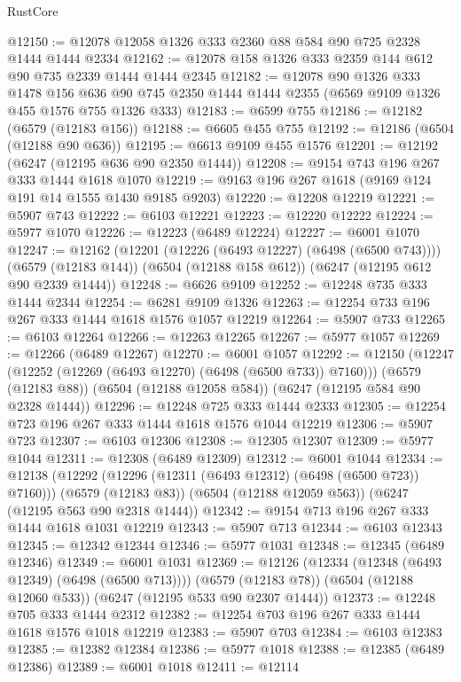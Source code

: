 \begin{lexlean}{RustCore}
\begin{coremodule}
@12150 := @12078 @12058 @1326 @333 @2360 @88 @584 @90 @725 @2328 @1444 @1444 @2334
@12162 := @12078 @158 @1326 @333 @2359 @144 @612 @90 @735 @2339 @1444 @1444 @2345
@12182 := @12078
    @90
    @1326
    @333
    @1478
    @156
    @636
    @90
    @745
    @2350
    @1444
    @1444
    @2355
    (@6569 @9109 @1326 @455 @1576 @755 @1326 @333)
@12183 := @6599 @755
@12186 := @12182 (@6579 (@12183 @156))
@12188 := @6605 @455 @755
@12192 := @12186 (@6504 (@12188 @90 @636))
@12195 := @6613 @9109 @455 @1576
@12201 := @12192 (@6247 (@12195 @636 @90 @2350 @1444))
@12208 := @9154 @743 @196 @267 @333 @1444 @1618 @1070
@12219 := @9163 @196 @267 @1618 (@9169 @124 @191 @14 @1555 @1430 @9185 @9203)
@12220 := @12208 @12219
@12221 := @5907 @743
@12222 := @6103 @12221
@12223 := @12220 @12222
@12224 := @5977 @1070
@12226 := @12223 (@6489 @12224)
@12227 := @6001 @1070
@12247 := @12162
    (@12201 (@12226 (@6493 @12227) (@6498 (@6500 @743))))
    (@6579 (@12183 @144))
    (@6504 (@12188 @158 @612))
    (@6247 (@12195 @612 @90 @2339 @1444))
@12248 := @6626 @9109
@12252 := @12248 @735 @333 @1444 @2344
@12254 := @6281 @9109 @1326
@12263 := @12254 @733 @196 @267 @333 @1444 @1618 @1576 @1057 @12219
@12264 := @5907 @733
@12265 := @6103 @12264
@12266 := @12263 @12265
@12267 := @5977 @1057
@12269 := @12266 (@6489 @12267)
@12270 := @6001 @1057
@12292 := @12150
    (@12247 (@12252 (@12269 (@6493 @12270) (@6498 (@6500 @733)) @7160)))
    (@6579 (@12183 @88))
    (@6504 (@12188 @12058 @584))
    (@6247 (@12195 @584 @90 @2328 @1444))
@12296 := @12248 @725 @333 @1444 @2333
@12305 := @12254 @723 @196 @267 @333 @1444 @1618 @1576 @1044 @12219
@12306 := @5907 @723
@12307 := @6103 @12306
@12308 := @12305 @12307
@12309 := @5977 @1044
@12311 := @12308 (@6489 @12309)
@12312 := @6001 @1044
@12334 := @12138
    (@12292 (@12296 (@12311 (@6493 @12312) (@6498 (@6500 @723)) @7160)))
    (@6579 (@12183 @83))
    (@6504 (@12188 @12059 @563))
    (@6247 (@12195 @563 @90 @2318 @1444))
@12342 := @9154 @713 @196 @267 @333 @1444 @1618 @1031 @12219
@12343 := @5907 @713
@12344 := @6103 @12343
@12345 := @12342 @12344
@12346 := @5977 @1031
@12348 := @12345 (@6489 @12346)
@12349 := @6001 @1031
@12369 := @12126
    (@12334 (@12348 (@6493 @12349) (@6498 (@6500 @713))))
    (@6579 (@12183 @78))
    (@6504 (@12188 @12060 @533))
    (@6247 (@12195 @533 @90 @2307 @1444))
@12373 := @12248 @705 @333 @1444 @2312
@12382 := @12254 @703 @196 @267 @333 @1444 @1618 @1576 @1018 @12219
@12383 := @5907 @703
@12384 := @6103 @12383
@12385 := @12382 @12384
@12386 := @5977 @1018
@12388 := @12385 (@6489 @12386)
@12389 := @6001 @1018
@12411 := @12114

\end{coremodule}
\end{lexlean}
